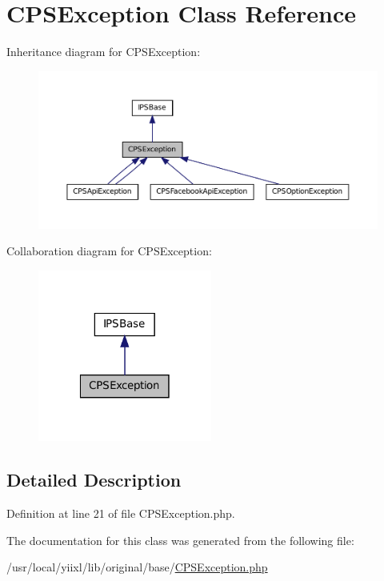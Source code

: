 \hypertarget{classCPSException}{
\section{CPSException Class Reference}
\label{classCPSException}
}


Inheritance diagram for CPSException:\nopagebreak
\begin{figure}[H]
\begin{center}
\leavevmode
\includegraphics[width=400pt]{classCPSException__inherit__graph}
\end{center}
\end{figure}


Collaboration diagram for CPSException:\nopagebreak
\begin{figure}[H]
\begin{center}
\leavevmode
\includegraphics[width=162pt]{classCPSException__coll__graph}
\end{center}
\end{figure}


\subsection{Detailed Description}


Definition at line 21 of file CPSException.php.



The documentation for this class was generated from the following file:\begin{DoxyCompactItemize}
\item 
/usr/local/yiixl/lib/original/base/\hyperlink{CPSException_8php}{CPSException.php}\end{DoxyCompactItemize}
